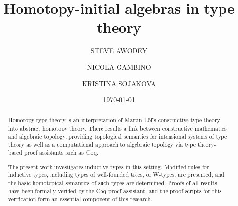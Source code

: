 \documentclass[reqno,10pt,a4paper,oneside]{amsart}
\numberwithin{equation}{section}
\theoremstyle{mythm}
\theoremstyle{mydef}
\theoremstyle{myrmk}
\begin{document}
\title{Homotopy-initial algebras in type theory}
\author[S. Awodey]{STEVE AWODEY}
\address{Carnegie Mellon University}
\author[N. Gambino]{NICOLA GAMBINO}
\address{School of Mathematics, University of Leeds}
\author[K. Sojakova]{KRISTINA SOJAKOVA}
\address{Carnegie Mellon University}
\date{\today}




\begin{abstract}
Homotopy type theory is an interpretation of Martin-L\"of's constructive type theory into abstract homotopy theory.   There results a link between constructive mathematics and algebraic topology, providing topological semantics for intensional systems of type theory as well as a computational approach to algebraic topology via type theory-based proof assistants such as~Coq.

The present work investigates inductive types in this setting. Modified rules for inductive types, including types of well-founded trees, or W-types, are presented, and the basic homotopical semantics of such types are determined.  Proofs of all results have been formally verified by the Coq proof assistant, and the proof scripts for this verification form an essential component of this research.      
\end{abstract}


\maketitle



\begin{small}
\tableofcontents
\end{small}
\end{document}
